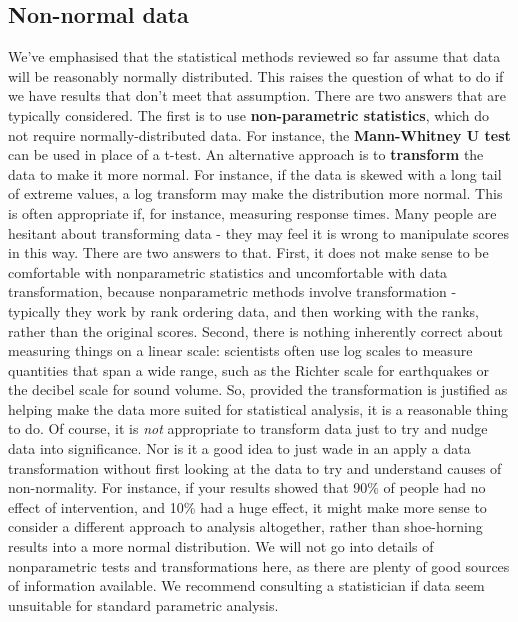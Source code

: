 \documentclass{krantz}
\begin{document}
\hypertarget{non-normal-data}{%
\subsection{Non-normal data}\label{non-normal-data}}

We've emphasised that the statistical methods reviewed so far assume that data will be reasonably normally distributed. This raises the question of what to do if we have results that don't meet that assumption. There are two answers that are typically considered. The first is to use \textbf{non-parametric statistics}, which do not require normally-distributed data. For instance, the \textbf{Mann-Whitney U test} can be used in place of a t-test. An alternative approach is to \textbf{transform} the data to make it more normal. For instance, if the data is skewed with a long tail of extreme values, a log transform may make the distribution more normal. This is often appropriate if, for instance, measuring response times. Many people are hesitant about transforming data - they may feel it is wrong to manipulate scores in this way. There are two answers to that. First, it does not make sense to be comfortable with nonparametric statistics and uncomfortable with data transformation, because nonparametric methods involve transformation - typically they work by rank ordering data, and then working with the ranks, rather than the original scores. Second, there is nothing inherently correct about measuring things on a linear scale: scientists often use log scales to measure quantities that span a wide range, such as the Richter scale for earthquakes or the decibel scale for sound volume. So, provided the transformation is justified as helping make the data more suited for statistical analysis, it is a reasonable thing to do. Of course, it is \emph{not} appropriate to transform data just to try and nudge data into significance. Nor is it a good idea to just wade in an apply a data transformation without first looking at the data to try and understand causes of non-normality. For instance, if your results showed that 90\% of people had no effect of intervention, and 10\% had a huge effect, it might make more sense to consider a different approach to analysis altogether, rather than shoe-horning results into a more normal distribution. We will not go into details of nonparametric tests and transformations here, as there are plenty of good sources of information available. We recommend consulting a statistician if data seem unsuitable for standard parametric analysis.
\end{document}
